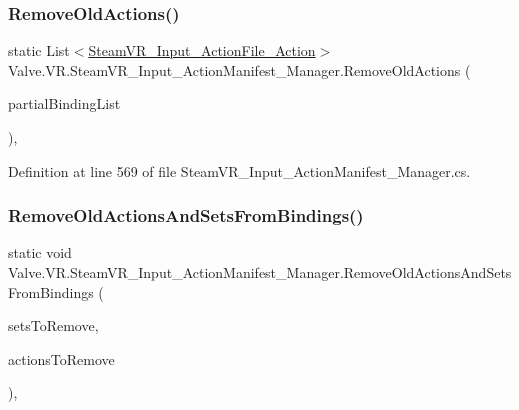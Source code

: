 \subsubsection{\texorpdfstring{RemoveOldActions()}{RemoveOldActions()}}
{\footnotesize\ttfamily static List$<$\mbox{\hyperlink{class_valve_1_1_v_r_1_1_steam_v_r___input___action_file___action}{Steam\+V\+R\+\_\+\+Input\+\_\+\+Action\+File\+\_\+\+Action}}$>$ Valve.\+V\+R.\+Steam\+V\+R\+\_\+\+Input\+\_\+\+Action\+Manifest\+\_\+\+Manager.\+Remove\+Old\+Actions (\begin{DoxyParamCaption}\item[{List$<$ \mbox{\hyperlink{class_valve_1_1_v_r_1_1_steam_v_r___partial_input_bindings}{Steam\+V\+R\+\_\+\+Partial\+Input\+Bindings}} $>$}]{partial\+Binding\+List }\end{DoxyParamCaption})\hspace{0.3cm}{\ttfamily [static]}, {\ttfamily [protected]}}



Definition at line 569 of file Steam\+V\+R\+\_\+\+Input\+\_\+\+Action\+Manifest\+\_\+\+Manager.\+cs.

\mbox{\label{class_valve_1_1_v_r_1_1_steam_v_r___input___action_manifest___manager_adfd8e2c3221d8e9f790081d8f5afdadb}} 
\subsubsection{\texorpdfstring{RemoveOldActionsAndSetsFromBindings()}{RemoveOldActionsAndSetsFromBindings()}}
{\footnotesize\ttfamily static void Valve.\+V\+R.\+Steam\+V\+R\+\_\+\+Input\+\_\+\+Action\+Manifest\+\_\+\+Manager.\+Remove\+Old\+Actions\+And\+Sets\+From\+Bindings (\begin{DoxyParamCaption}\item[{List$<$ \mbox{\hyperlink{class_valve_1_1_v_r_1_1_steam_v_r___input___action_file___action_set}{Steam\+V\+R\+\_\+\+Input\+\_\+\+Action\+File\+\_\+\+Action\+Set}} $>$}]{sets\+To\+Remove,  }\item[{List$<$ \mbox{\hyperlink{class_valve_1_1_v_r_1_1_steam_v_r___input___action_file___action}{Steam\+V\+R\+\_\+\+Input\+\_\+\+Action\+File\+\_\+\+Action}} $>$}]{actions\+To\+Remove }\end{DoxyParamCaption})\hspace{0.3cm}{\ttfamily [static]}, {\ttfamily [protected]}}



